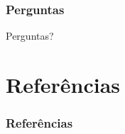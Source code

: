 \documentclass{beamer}
\begin{document}
\begin{frame}
    \frametitle{Perguntas}

    \begin{center}
        {\huge Perguntas?}
    \end{center}
\end{frame}

\nocite{archoverview}
\nocite{archteture}
\nocite{newnorm}
\nocite{management}
\nocite{onf:cpe}
\nocite{survey}
\nocite{networkinalaptop}
\nocite{mininetproto}
\nocite{maxinet}
\nocite{mininethifi}

\section{Refer\^encias}
\begin{frame}[allowframebreaks]
    \frametitle{Refer\^encias}
    
    
\end{frame}
\end{document}

